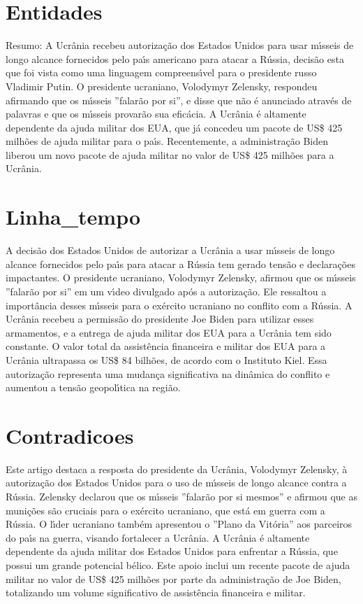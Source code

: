\documentclass[article,11pt,oneside,a4paper,brazil,sumario=tradicional]{abntex2}%
\begin{document}
%
\section{Entidades}%
\label{sec:Entidades}%
Resumo:
A Ucr\^ania recebeu autoriza\c{c}\~ao dos Estados Unidos para usar m{\'\i}sseis de longo alcance fornecidos pelo pa{\'\i}s americano para atacar a R\'ussia, decis\~ao esta que foi vista como uma linguagem compreens{\'\i}vel para o presidente russo Vladimir Putin. O presidente ucraniano, Volodymyr Zelensky, respondeu afirmando que os m{\'\i}sseis ''falar\~ao por si'', e disse que n\~ao \'e anunciado atrav\'es de palavras e que os m{\'\i}sseis provar\~ao sua efic\'acia. A Ucr\^ania \'e altamente dependente da ajuda militar dos EUA, que j\'a concedeu um pacote de US\$ 425 milh\~oes de ajuda militar para o pa{\'\i}s. Recentemente, a administra\c{c}\~ao Biden liberou um novo pacote de ajuda militar no valor de US\$ 425 milh\~oes para a Ucr\^ania.

%
\section{Linha\_tempo}%
\label{sec:Linhatempo}%
A decis\~ao dos Estados Unidos de autorizar a Ucr\^ania a usar m{\'\i}sseis de longo alcance fornecidos pelo pa{\'\i}s para atacar a R\'ussia tem gerado tens\~ao e declara\c{c}\~oes impactantes. O presidente ucraniano, Volodymyr Zelensky, afirmou que os m{\'\i}sseis ''falar\~ao por si'' em um v{\'\i}deo divulgado ap\'os a autoriza\c{c}\~ao. Ele ressaltou a import\^ancia desses m{\'\i}sseis para o ex\'ercito ucraniano no conflito com a R\'ussia. A Ucr\^ania recebeu a permiss\~ao do presidente Joe Biden para utilizar esses armamentos, e a entrega de ajuda militar dos EUA para a Ucr\^ania tem sido constante. O valor total da assist\^encia financeira e militar dos EUA para a Ucr\^ania ultrapassa os US\$ 84 bilh\~oes, de acordo com o Instituto Kiel. Essa autoriza\c{c}\~ao representa uma mudan\c{c}a significativa na din\^amica do conflito e aumentou a tens\~ao geopol{\'\i}tica na regi\~ao.

%
\section{Contradicoes}%
\label{sec:Contradicoes}%
Este artigo destaca a resposta do presidente da Ucr\^ania, Volodymyr Zelensky, \`a autoriza\c{c}\~ao dos Estados Unidos para o uso de m{\'\i}sseis de longo alcance contra a R\'ussia. Zelensky declarou que os m{\'\i}sseis ''falar\~ao por si mesmos'' e afirmou que as muni\c{c}\~oes s\~ao cruciais para o ex\'ercito ucraniano, que est\'a em guerra com a R\'ussia. O l{\'\i}der ucraniano tamb\'em apresentou o ''Plano da Vit\'oria'' aos parceiros do pa{\'\i}s na guerra, visando fortalecer a Ucr\^ania. A Ucr\^ania \'e altamente dependente da ajuda militar dos Estados Unidos para enfrentar a R\'ussia, que possui um grande potencial b\'elico. Este apoio inclui um recente pacote de ajuda militar no valor de US\$ 425 milh\~oes por parte da administra\c{c}\~ao de Joe Biden, totalizando um volume significativo de assist\^encia financeira e militar.
\end{document}

